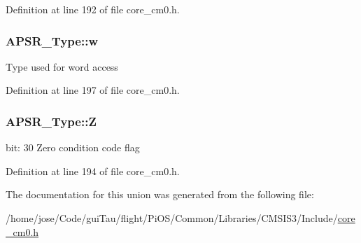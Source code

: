Definition at line 192 of file core\-\_\-cm0.\-h.

\hypertarget{union_a_p_s_r___type_ae4c2ef8c9430d7b7bef5cbfbbaed3a94}{
\subsubsection[{w}]{ A\-P\-S\-R\-\_\-\-Type\-::w}}\label{union_a_p_s_r___type_ae4c2ef8c9430d7b7bef5cbfbbaed3a94}
Type used for word access 

Definition at line 197 of file core\-\_\-cm0.\-h.

\hypertarget{union_a_p_s_r___type_a3b04d58738b66a28ff13f23d8b0ba7e5}{
\subsubsection[{Z}]{ A\-P\-S\-R\-\_\-\-Type\-::\-Z}}\label{union_a_p_s_r___type_a3b04d58738b66a28ff13f23d8b0ba7e5}
bit\-: 30 Zero condition code flag 

Definition at line 194 of file core\-\_\-cm0.\-h.



The documentation for this union was generated from the following file\-:\begin{DoxyCompactItemize}
\item 
/home/jose/\-Code/gui\-Tau/flight/\-Pi\-O\-S/\-Common/\-Libraries/\-C\-M\-S\-I\-S3/\-Include/\hyperlink{core__cm0_8h}{core\-\_\-cm0.\-h}\end{DoxyCompactItemize}
